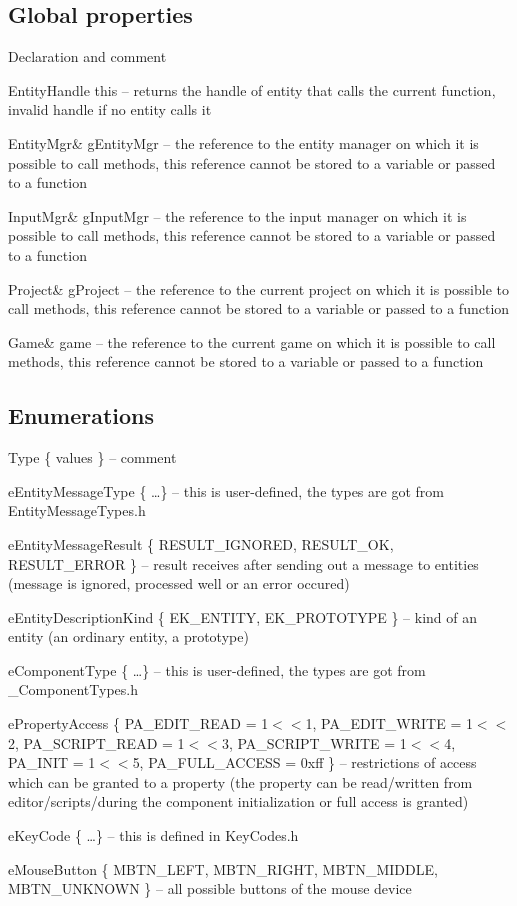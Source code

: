 \subsection{Global properties}

\begin{titled-itemize}{Declaration and comment}
  \item EntityHandle this -- returns the handle of entity that calls the current function, invalid handle if no entity calls it
  \item EntityMgr\& gEntityMgr -- the reference to the entity manager on which it is possible to call methods, this reference cannot be stored to a variable or passed to a function
  \item InputMgr\& gInputMgr -- the reference to the input manager on which it is possible to call methods, this reference cannot be stored to a variable or passed to a function
  \item Project\& gProject -- the reference to the current project on which it is possible to call methods, this reference cannot be stored to a variable or passed to a function
  \item Game\& game -- the reference to the current game on which it is possible to call methods, this reference cannot be stored to a variable or passed to a function
\end{titled-itemize}

\subsection{Enumerations}

\begin{titled-itemize}{Type \{ values \} -- comment}
  \item eEntityMessageType \{ \ldots \} -- this is user-defined, the types are got from EntityMessageTypes.h
  \item eEntityMessageResult \{ RESULT\_IGNORED, RESULT\_OK, RE\-SULT\-\_\-ER\-ROR \} -- result receives after sending out a message to entities (message is ignored, processed well or an error occured)
  \item eEntityDescriptionKind \{ EK\_ENTITY, EK\_PROTOTYPE \} -- kind of an entity (an ordinary entity, a prototype)
  \item eComponentType \{ \ldots \} -- this is user-defined, the types are got from \_ComponentTypes.h 
  \item ePropertyAccess \{ PA\_EDIT\_READ = 1$<<$1, PA\_EDIT\_WRITE = 1$<<$2, PA\_SCRIPT\_READ = 1$<<$3, PA\_SCRIPT\_WRITE = 1$<<$4, PA\_INIT = 1$<<$5, PA\_FULL\_ACCESS = 0xff \} -- restrictions of access which can be granted to a property (the property can be read/written from editor/scripts/during the component initialization or full access is granted)
  \item eKeyCode \{ \ldots \} -- this is defined in KeyCodes.h
  \item eMouseButton \{ MBTN\_LEFT, MBTN\_RIGHT, MBTN\_MIDDLE, \\MBTN\_UNKNOWN \} -- all possible buttons of the mouse device
\end{titled-itemize}

